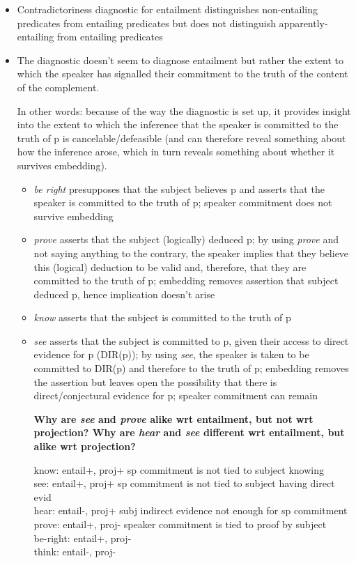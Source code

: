 \documentclass[11pt,fleqn]{article}
\newcommand{\6}{\mbox{$[\hspace*{-.6mm}[$}}
\newcommand{\9}{\mbox{$]\hspace*{-.6mm}]$}}
\begin{document}
\begin{itemize}

\item Contradictoriness diagnostic for entailment distinguishes non-entailing predicates from entailing predicates but does not distinguish apparently-entailing from entailing predicates

\item The diagnostic doesn't seem to diagnose entailment but rather the extent to which the speaker has signalled their commitment to the truth of the content of the complement.

In other words: because of the way the diagnostic is set up, it provides insight into the extent to which the inference that the speaker is committed to the truth of p is cancelable/defeasible (and can therefore reveal something about how the inference arose, which in turn reveals something about whether it survives embedding). 

\begin{itemize}

\item {\em be right} presupposes that the subject believes p and asserts that the speaker is committed to the truth of p; speaker commitment does not survive embedding

\item {\em prove} asserts that the subject (logically) deduced p; by using {\em prove} and not saying anything to the contrary, the speaker implies that they believe this (logical) deduction to be valid and, therefore, that they are committed to the truth of p; embedding removes assertion that subject deduced p, hence implication doesn't arise

\item {\em know} asserts that the subject is committed to the truth of p

\item {\em see} asserts that the subject is committed to p, given their access to direct evidence for p (DIR(p)); by using {\em see}, the speaker is taken to be committed to DIR(p) and therefore to the truth of p; embedding removes the assertion but leaves open the possibility that there is direct/conjectural evidence for p; speaker commitment can remain

{\bf Why are {\em see} and {\em prove} alike wrt entailment, but not wrt projection? Why are {\em hear} and {\em see} different wrt entailment, but alike wrt projection?}

know: entail+, proj+		sp commitment is not tied to subject knowing
\\ see: entail+, proj+			sp commitment is not tied to subject having direct evid
\\ hear: entail-, proj+		subj indirect evidence not enough for sp commitment
\\ prove: entail+, proj-		speaker commitment is tied to proof by subject
\\ be-right: entail+, proj-
\\ think: entail-, proj-


\end{itemize}
\end{itemize}
\end{document}
